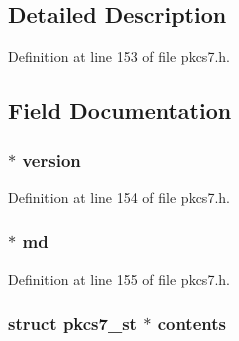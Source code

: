\subsection{Detailed Description}


Definition at line 153 of file pkcs7.\+h.



\subsection{Field Documentation}
\subsubsection[{\texorpdfstring{version}{version}}]{ $\ast$ version}\hypertarget{structpkcs7__digest__st_abf367aeef355b6acf5be7c569c4b28b0}{}\label{structpkcs7__digest__st_abf367aeef355b6acf5be7c569c4b28b0}


Definition at line 154 of file pkcs7.\+h.

\subsubsection[{\texorpdfstring{md}{md}}]{ $\ast$ md}\hypertarget{structpkcs7__digest__st_a8340dae2b5df8412e96bd4a25c48e1f5}{}\label{structpkcs7__digest__st_a8340dae2b5df8412e96bd4a25c48e1f5}


Definition at line 155 of file pkcs7.\+h.

\subsubsection[{\texorpdfstring{contents}{contents}}]{\setlength{\rightskip}{0pt plus 5cm}struct {\bf pkcs7\+\_\+st} $\ast$ contents}\hypertarget{structpkcs7__digest__st_aeef95972194d66973936592656c73700}{}\label{structpkcs7__digest__st_aeef95972194d66973936592656c73700}


